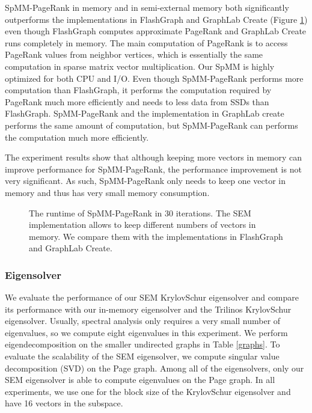 SpMM-PageRank in memory and in semi-external memory both significantly outperforms
the implementations in FlashGraph and GraphLab Create (Figure \ref{perf:pagerank})
even though FlashGraph computes approximate PageRank and GraphLab Create runs
completely in memory. The main computation of PageRank is to access PageRank
values from neighbor vertices, which is essentially the same computation in
sparse matrix vector multiplication. Our SpMM is highly optimized for both CPU
and I/O. Even though SpMM-PageRank performs more computation than FlashGraph,
it performs the computation required by PageRank much more efficiently and
needs to less data from SSDs than FlashGraph. SpMM-PageRank and the implementation
in GraphLab create performs the same amount of computation, but SpMM-PageRank
can performs the computation much more efficiently.

The experiment results show that although keeping more vectors in memory can
improve performance for SpMM-PageRank, the performance improvement is not very
significant. As such, SpMM-PageRank only needs to keep one vector in memory
and thus has very small memory consumption.

\begin{figure}
	\begin{center}
		\footnotesize
		
		\caption{The runtime of SpMM-PageRank in 30 iterations. The SEM
			implementation allows to keep different numbers of vectors in memory.
			We compare them with the implementations in FlashGraph and GraphLab
		Create.}
		\label{perf:pagerank}
	\end{center}
\end{figure}

\subsubsection{Eigensolver}

We evaluate the performance of our SEM KrylovSchur eigensolver and compare
its performance
with our in-memory eigensolver and the Trilinos KrylovSchur eigensolver.
Usually, spectral analysis \cite{} only requires a very small number of
eigenvalues, so we compute eight eigenvalues in this experiment. We perform
eigendecomposition on the smaller undirected graphs
in Table \ref{graphs}. To evaluate the scalability of the SEM eigensolver,
we compute singular value decomposition (SVD) on the Page graph. Among all of
the eigensolvers, only our SEM eigensolver is able to compute eigenvalues
on the Page graph. In all experiments, we use one for the block size of
the KrylovSchur eigensolver and have 16 vectors in the subspace.

